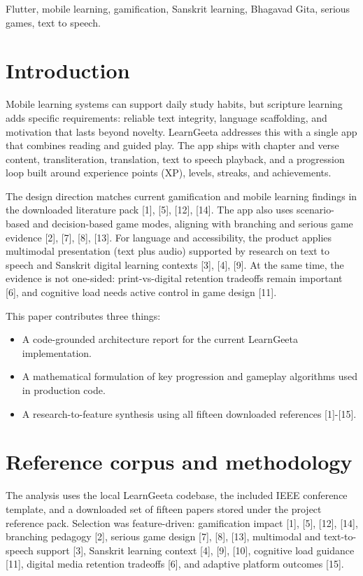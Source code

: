 \documentclass[conference]{IEEEtran}
\begin{document}
\begin{IEEEkeywords}
Flutter, mobile learning, gamification, Sanskrit learning, Bhagavad Gita, serious games, text to speech.
\end{IEEEkeywords}

\section{Introduction}
Mobile learning systems can support daily study habits, but scripture learning adds specific requirements: reliable text integrity, language scaffolding, and motivation that lasts beyond novelty. LearnGeeta addresses this with a single app that combines reading and guided play. The app ships with chapter and verse content, transliteration, translation, text to speech playback, and a progression loop built around experience points (XP), levels, streaks, and achievements.

The design direction matches current gamification and mobile learning findings in the downloaded literature pack [1], [5], [12], [14]. The app also uses scenario-based and decision-based game modes, aligning with branching and serious game evidence [2], [7], [8], [13]. For language and accessibility, the product applies multimodal presentation (text plus audio) supported by research on text to speech and Sanskrit digital learning contexts [3], [4], [9]. At the same time, the evidence is not one-sided: print-vs-digital retention tradeoffs remain important [6], and cognitive load needs active control in game design [11].

This paper contributes three things:
\begin{itemize}
\item A code-grounded architecture report for the current LearnGeeta implementation.
\item A mathematical formulation of key progression and gameplay algorithms used in production code.
\item A research-to-feature synthesis using all fifteen downloaded references [1]-[15].
\end{itemize}

\section{Reference corpus and methodology}
The analysis uses the local LearnGeeta codebase, the included IEEE conference template, and a downloaded set of fifteen papers stored under the project reference pack. Selection was feature-driven: gamification impact [1], [5], [12], [14], branching pedagogy [2], serious game design [7], [8], [13], multimodal and text-to-speech support [3], Sanskrit learning context [4], [9], [10], cognitive load guidance [11], digital media retention tradeoffs [6], and adaptive platform outcomes [15].
\end{document}
